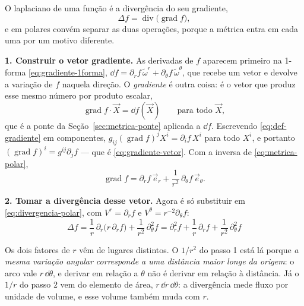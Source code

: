 \documentclass[12pt,a4paper,oneside]{book}
\theoremstyle{rgplain}
\theoremstyle{rgremark}
\begin{document}
O laplaciano de uma função é a divergência do seu gradiente,
\[
  \Delta f=\operatorname{div}\bigl(\operatorname{grad}f\bigr),
\]
e em polares convém separar as duas operações, porque a métrica entra em cada
uma por um motivo diferente.

\textbf{1. Construir o vetor gradiente.} As derivadas de $f$ aparecem
primeiro na 1-forma \eqref{eq:gradiente-1forma},
$\dd f=\partial_rf\,\tilde\omega^r+\partial_\theta f\,\tilde\omega^\theta$,
que recebe um vetor e devolve a variação de $f$ naquela direção. O
\emph{gradiente} é outra coisa: é o vetor que produz esse mesmo número por
produto escalar,
\begin{equation}
  \operatorname{grad}f\cdot\vec X=\dd f(\vec X)
  \qquad\text{para todo }\vec X ,
  \label{eq:def-gradiente}
\end{equation}
que é a ponte da Seção~\ref{sec:metrica-ponte} aplicada a $\dd f$. Escrevendo
\eqref{eq:def-gradiente} em componentes, $g_{ij}(\operatorname{grad}f)^jX^i
=\partial_if\,X^i$ para todo $X^i$, e portanto
$(\operatorname{grad}f)^i=g^{ij}\partial_jf$ --- que é
\eqref{eq:gradiente-vetor}. Com a inversa de \eqref{eq:metrica-polar},
\[
  \operatorname{grad}f=\partial_rf\,\vec e_r
  +\frac{1}{r^2}\,\partial_\theta f\,\vec e_\theta .
\]

\textbf{2. Tomar a divergência desse vetor.} Agora é só substituir em
\eqref{eq:divergencia-polar}, com $V^r=\partial_rf$ e
$V^\theta=r^{-2}\partial_\theta f$:
\begin{equation}
  \boxed{\ \Delta f=\frac1r\,\partial_r\bigl(r\,\partial_rf\bigr)
  +\frac{1}{r^2}\,\partial^2_\theta f
  =\partial_r^2f+\frac1r\,\partial_rf
  +\frac{1}{r^2}\,\partial^2_\theta f\ }
  \label{eq:laplaciano-polar}
\end{equation}

Os dois fatores de $r$ vêm de lugares distintos. O $1/r^2$ do passo 1 está lá porque \emph{a mesma variação angular
corresponde a uma distância maior longe da origem}: o arco vale $r\,\dd\theta$,
e derivar em relação a $\theta$ não é derivar em relação à distância. Já o
$1/r$ do passo 2 vem do elemento de área, $r\,\dd r\,\dd\theta$: a divergência
mede fluxo por unidade de volume, e esse volume também muda com $r$.
\end{document}
